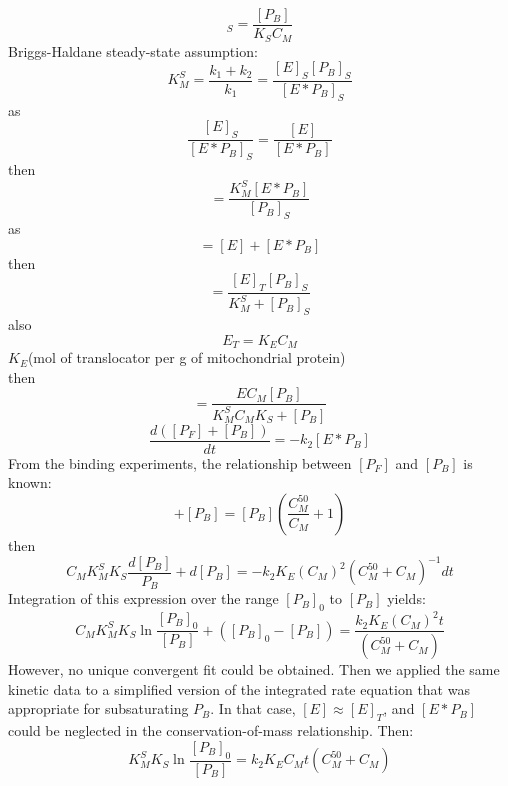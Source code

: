 \begin{equation}
[P_B]_S=\frac{[P_B]}{K_S C_M}
\end{equation}
Briggs-Haldane steady-state assumption:
\begin{equation}
K_M^S=\frac{k_1+k_2}{k_1}=\frac{[E]_S [P_B]_S}{[E*P_B]_S}
\end{equation}
as
\begin{equation}
\frac{[E]_S}{[E*P_B]_S}=\frac{[E]}{[E*P_B]}
\end{equation}
then
\begin{equation}
[E]=\frac{K_M^S[E*P_B]}{[P_B]_S}
\end{equation}
as
\begin{equation}
[E_T]=[E]+[E*P_B]
\end{equation}
then
\begin{equation}
[E*P_B]=\frac{[E]_T[P_B]_S}{K_M^S+[P_B]_S}
\end{equation}
also
\begin{equation}
E_T=K_EC_M
\end{equation}
$K_E$(mol of translocator per g of mitochondrial protein) \\
then
\begin{equation}
[E*P_B]=\frac{EC_M[P_B]}{K_M^SC_MK_S+[P_B]}
\end{equation}
\begin{equation}
\frac{d([P_F]+[P_B])}{d t}=-k_2[E*P_B]
\end{equation}
From the binding experiments, the relationship between $[P_F]$ and $[P_B]$ is known:
\begin{equation}
[P_F]+[P_B]=[P_B](\frac{C_M^{50}}{C_M}+1)
\end{equation}
then
\begin{equation}
C_MK_M^SK_S \frac{d[P_B]}{P_B}+d[P_B]=-k_2K_E(C_M)^2(C_M^{50}+C_M)^{-1} d t
\end{equation}
Integration of this expression over the range $[P_B]_0$ to $[P_B]$ yields:
\begin{equation}
C_MK_M^SK_S\ln\frac{[P_B]_0}{[P_B]}+([P_B]_0-[P_B])=\frac{k_2K_E(C_M)^2 t}{(C_M^{50}+C_M)}
\end{equation}
However, no unique convergent fit could be obtained. Then we applied the same kinetic data to a simplified version of the integrated rate equation that was appropriate for subsaturating $P_B$. In that case,  $[E] \approx [E]_T$, and $[E*P_B]$ could be neglected in the conservation-of-mass relationship. Then:
\begin{equation}
K_M^SK_S\ln\frac{[P_B]_0}{[P_B]}=k_2K_EC_Mt(C_M^{50}+C_M)
\end{equation}
